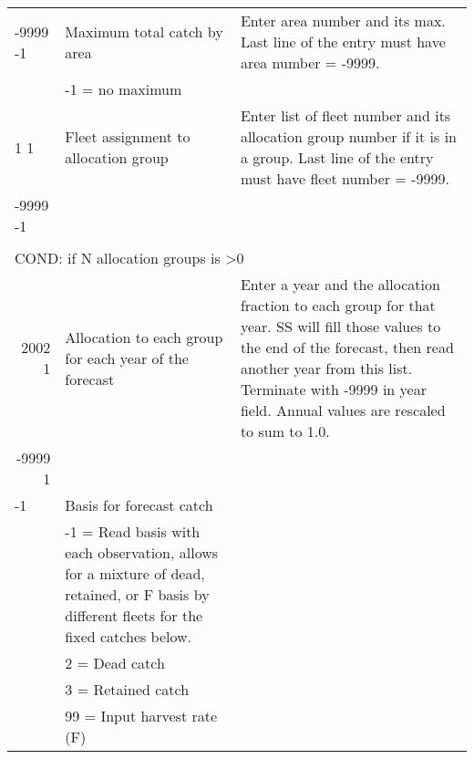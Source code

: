 \begin{landscape}
\begin{longtable}{p{3.2cm} p{7cm} p{10.8cm}}
  -9999 -1 & Maximum total catch by area & \multirow{1}{1cm}[-0.1cm]{\parbox{11cm}{Enter area number and its max. Last line of the entry must have area number = -9999.}} \\
     & -1 = no maximum & \\
     
  \hline
  1 1  & Fleet assignment to allocation group & \multirow{1}{1cm}[-0.1cm]{\parbox{11cm}{Enter list of fleet number and its allocation group number if it is in a group. Last line of the entry must have fleet number = -9999.}} \\
  -9999 -1  & & \\ \\ 
    
  \multicolumn{3}{l}{COND: if N allocation groups is >0 } \\
  \multicolumn{1}{r}{2002 1}  & Allocation to each group for each year of the forecast & Enter a year and the allocation fraction to each group for that year.  SS will fill those values to the end of the forecast, then read another year from this list.  Terminate with -9999 in year field. Annual values are rescaled to sum to 1.0. \\
  \multicolumn{1}{r}{-9999 1} & & \\
  
  \hline
    -1 & Basis for forecast catch & \\
    & -1 = Read basis with each observation, allows for a mixture of dead, retained, or F basis by different fleets for the fixed catches below. & \\
    & 2 = Dead catch & \\
    & 3 = Retained catch & \\
    & 99 = Input harvest rate (F) & \\
    

\end{longtable}
\end{landscape}
